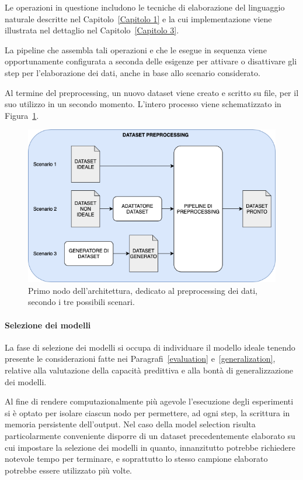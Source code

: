 \documentclass[12pt]{report}
\theoremstyle{definition}
\begin{document}
Le operazioni in questione includono le tecniche di elaborazione del linguaggio naturale descritte nel Capitolo~\ref{Capitolo 1} e la cui implementazione viene illustrata nel dettaglio nel Capitolo~\ref{Capitolo 3}.

La pipeline che assembla tali operazioni e che le esegue in sequenza viene opportunamente configurata a seconda delle esigenze per attivare o disattivare gli step per l'elaborazione dei dati, anche in base allo scenario considerato.

Al termine del preprocessing, un nuovo dataset viene creato e scritto su file, per il suo utilizzo in un secondo momento. L'intero processo viene schematizzato in Figura~\ref{preprocessmodule}.

\begin{figure}
    \centering
    \includegraphics[scale=0.6]{images/preprocessingmodule.png}
    \caption{Primo nodo dell'architettura, dedicato al preprocessing dei dati, secondo i tre possibili scenari.}
    \label{preprocessmodule}
\end{figure}

\paragraph{Selezione dei modelli}
La fase di selezione dei modelli si occupa di individuare il modello ideale tenendo presente le considerazioni fatte nei Paragrafi~\ref{evaluation} e~\ref{generalization}, relative alla valutazione della capacità predittiva e alla bontà di generalizzazione dei modelli.

Al fine di rendere computazionalmente più agevole l'esecuzione degli esperimenti si è optato per isolare ciascun nodo per permettere, ad ogni step, la scrittura in memoria persistente dell'output. Nel caso della model selection risulta particolarmente conveniente disporre di un dataset precedentemente elaborato su cui impostare la selezione dei modelli in quanto, innanzitutto potrebbe richiedere notevole tempo per terminare, e soprattutto lo stesso campione elaborato potrebbe essere utilizzato più volte.
\end{document}
